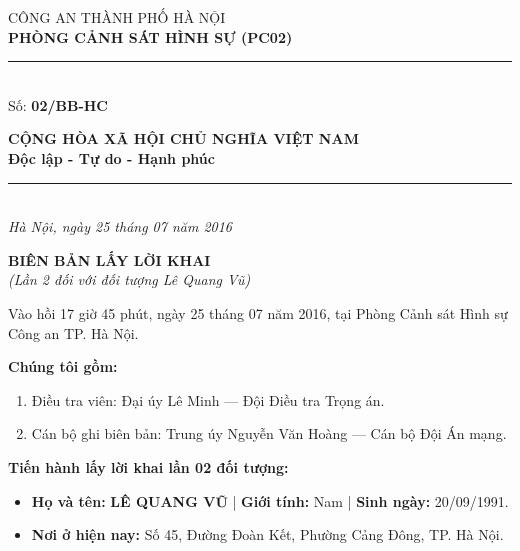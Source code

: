 \documentclass[12pt,a4paper]{article}
\begin{document}
\noindent
\begin{minipage}[t]{0.46\textwidth}
    \begin{center}
        \fontsize{11pt}{13pt}\selectfont
        CÔNG AN THÀNH PHỐ HÀ NỘI\\
        \textbf{PHÒNG CẢNH SÁT HÌNH SỰ (PC02)}\\[-0.2em]
        \rule{3.2cm}{0.6pt}\\[0.25cm]
        \fontsize{11pt}{13pt}\selectfont Số: \textbf{02/BB-HC}
    \end{center}
\end{minipage}
\hfill
\begin{minipage}[t]{0.52\textwidth}
    \begin{center}
        \fontsize{11pt}{13pt}\selectfont
        \textbf{CỘNG HÒA XÃ HỘI CHỦ NGHĨA VIỆT NAM}\\
        \textbf{Độc lập - Tự do - Hạnh phúc}\\[-0.2em]
        \rule{3.6cm}{0.6pt}\\[0.25cm]
        \textit{Hà Nội, ngày 25 tháng 07 năm 2016}
    \end{center}
\end{minipage}

\vspace{0.5cm}

\begin{center}
    \textbf{\Large BIÊN BẢN LẤY LỜI KHAI}\\[0.15cm]
    \textit{(Lần 2 đối với đối tượng Lê Quang Vũ)}
\end{center}

\vspace{0.3cm}


Vào hồi 17 giờ 45 phút, ngày 25 tháng 07 năm 2016, tại Phòng Cảnh sát Hình sự Công an TP. Hà Nội.

\textbf{Chúng tôi gồm:}

\begin{enumerate}[label=\arabic*., leftmargin=*, itemsep=2pt, topsep=2pt, parsep=0pt]
  \item Điều tra viên: Đại úy Lê Minh — Đội Điều tra Trọng án.
  \item Cán bộ ghi biên bản: Trung úy Nguyễn Văn Hoàng — Cán bộ Đội Án mạng.

\end{enumerate}
\textbf{Tiến hành lấy lời khai lần 02 đối tượng:}

\begin{itemize}[leftmargin=*, itemsep=2pt, topsep=2pt, parsep=0pt]
  \item \textbf{Họ và tên:} \textbf{LÊ QUANG VŨ} | \textbf{Giới tính:} Nam | \textbf{Sinh ngày:} 20/09/1991.
  \item \textbf{Nơi ở hiện nay:} Số 45, Đường Đoàn Kết, Phường Cảng Đông, TP. Hà Nội.


\end{itemize}
\end{document}
